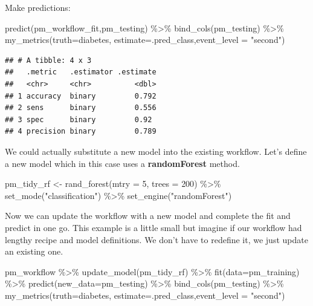 \documentclass[
]{article}
\newenvironment{Shaded}{\begin{snugshade}}{\end{snugshade}}
\newcommand{\AttributeTok}[1]{\textcolor[rgb]{0.77,0.63,0.00}{#1}}
\newcommand{\DecValTok}[1]{\textcolor[rgb]{0.00,0.00,0.81}{#1}}
\newcommand{\FunctionTok}[1]{\textcolor[rgb]{0.00,0.00,0.00}{#1}}
\newcommand{\NormalTok}[1]{#1}
\newcommand{\OtherTok}[1]{\textcolor[rgb]{0.56,0.35,0.01}{#1}}
\newcommand{\SpecialCharTok}[1]{\textcolor[rgb]{0.00,0.00,0.00}{#1}}
\newcommand{\StringTok}[1]{\textcolor[rgb]{0.31,0.60,0.02}{#1}}
\begin{document}
Make predictions:

\begin{Shaded}
\begin{Highlighting}[]
\FunctionTok{predict}\NormalTok{(pm\_workflow\_fit,pm\_testing) }\SpecialCharTok{\%\textgreater{}\%}
  \FunctionTok{bind\_cols}\NormalTok{(pm\_testing) }\SpecialCharTok{\%\textgreater{}\%}
  \FunctionTok{my\_metrics}\NormalTok{(}\AttributeTok{truth=}\NormalTok{diabetes, }\AttributeTok{estimate=}\NormalTok{.pred\_class,}\AttributeTok{event\_level =} \StringTok{"second"}\NormalTok{)}
\end{Highlighting}
\end{Shaded}

\begin{verbatim}
## # A tibble: 4 x 3
##   .metric   .estimator .estimate
##   <chr>     <chr>          <dbl>
## 1 accuracy  binary         0.792
## 2 sens      binary         0.556
## 3 spec      binary         0.92 
## 4 precision binary         0.789
\end{verbatim}

We could actually substitute a new model into the existing workflow.
Let's define a new model which in this case uses a \textbf{randomForest}
method.

\begin{Shaded}
\begin{Highlighting}[]
\NormalTok{pm\_tidy\_rf }\OtherTok{\textless{}{-}} \FunctionTok{rand\_forest}\NormalTok{(}\AttributeTok{mtry =} \DecValTok{5}\NormalTok{, }\AttributeTok{trees =} \DecValTok{200}\NormalTok{) }\SpecialCharTok{\%\textgreater{}\%} 
  \FunctionTok{set\_mode}\NormalTok{(}\StringTok{"classification"}\NormalTok{) }\SpecialCharTok{\%\textgreater{}\%} 
  \FunctionTok{set\_engine}\NormalTok{(}\StringTok{"randomForest"}\NormalTok{)}
\end{Highlighting}
\end{Shaded}

Now we can update the workflow with a new model and complete the fit and
predict in one go. This example is a little small but imagine if our
workflow had lengthy recipe and model definitions. We don't have to
redefine it, we just update an existing one.

\begin{Shaded}
\begin{Highlighting}[]
\NormalTok{pm\_workflow }\SpecialCharTok{\%\textgreater{}\%}
  \FunctionTok{update\_model}\NormalTok{(pm\_tidy\_rf) }\SpecialCharTok{\%\textgreater{}\%}
  \FunctionTok{fit}\NormalTok{(}\AttributeTok{data=}\NormalTok{pm\_training) }\SpecialCharTok{\%\textgreater{}\%}
  \FunctionTok{predict}\NormalTok{(}\AttributeTok{new\_data=}\NormalTok{pm\_testing) }\SpecialCharTok{\%\textgreater{}\%}
  \FunctionTok{bind\_cols}\NormalTok{(pm\_testing) }\SpecialCharTok{\%\textgreater{}\%}
  \FunctionTok{my\_metrics}\NormalTok{(}\AttributeTok{truth=}\NormalTok{diabetes, }\AttributeTok{estimate=}\NormalTok{.pred\_class,}\AttributeTok{event\_level =} \StringTok{"second"}\NormalTok{)}
\end{Highlighting}
\end{Shaded}
\end{document}

